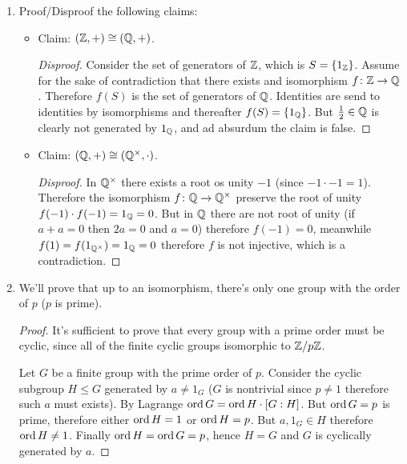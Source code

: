 \documentclass[a4paper]{article}
\begin{document}
\begin{enumerate}
\begin{enumerate}
			\item Let $G = \Z, H = \Z/n\Z$. Claim: $f(z) = [anz]$ for $a \in \Z$ are the only homomorphisms $\Z \to \Z/n\Z$. It's clearly a homomorphisms. And the proof the existence is similar to the one in (A)
			\item 
			\item 
		\end{enumerate}
		\item Proof/Disproof the following claims: 
		\begin{itemize}
			\item Claim: $(\mathbb{Z}, +) \cong (\mathbb{Q}, +)$. \begin{proof}[Disproof]
				Consider the set of generators of $\mathbb{Z}$, which is $S = \{1_{\mathbb{Z}}\}$. Assume for the sake of contradiction that there exists and isomorphism $f \colon \mathbb{Z}\to \mathbb{Q}$. Therefore $f(S)$ is the set of generators of $\mathbb{Q}$. Identities are send to identities by isomorphisms and thereafter $f(S) = \{1_{\mathbb{Q}}\}$. But $\frac{1}{2} \in \mathbb{Q}$ is clearly not generated by $1_{\mathbb{Q}}$, and ad absurdum the claim is false. 
			\end{proof}
			\item Claim: $(\mathbb{Q}, +) \cong (\mathbb{Q}^\times, \cdot)$. \begin{proof}[Disproof]
				In $\mathbb{Q}^\times$ there exists a root os unity $-1$ (since $-1 \cdot -1 = 1$). Therefore the isomorphism $f \colon \mathbb{Q} \to \mathbb{Q}^\times$ preserve the root of unity $f(-1) \cdot f(-1) = 1_{\mathbb{Q}} = 0$. But in $\mathbb{Q}$ there are not root of unity (if $a + a = 0$ then $2a = 0$ and $a = 0$) therefore $f(-1) = 0$, meanwhile $f(1) = f(1_{\mathbb{Q}^{\times}}) = 1_{\mathbb{Q}} = 0$ therefore $f$ is not injective, which is a contradiction. 
			\end{proof}
		\end{itemize}
		\item We'll prove that up to an isomorphism, there's only one group with the order of $p$ ($p$ is prime). \begin{proof}
			It's sufficient to prove that every group with a prime order must be cyclic, since all of the finite cyclic groups isomorphic to $\mathbb{Z}/p\mathbb{Z}$. 
			
			Let $G$ be a finite group with the prime order of $p$. Consider the cyclic subgroup $H \le G$ generated by $a \neq 1_G$ ($G$ is nontrivial since $p \neq 1$ therefore such $a$ must exists). By Lagrange $\operatorname{ord} G = \operatorname{ord} H \cdot [G : H]$. But $\operatorname{ord} G = p$ is prime, therefore either $\operatorname{ord} H = 1$ or $\operatorname{ord} H = p$. But $a, 1_G \in H$ therefore $\operatorname{ord} H \neq 1$. Finally $\operatorname{ord} H = \operatorname{ord} G = p$, hence $H = G$ and $G$ is cyclically generated by $a$. 
		\end{proof}
	\end{enumerate}
	
	\section{}
	
	
	
	
	
	
	
\end{document}
